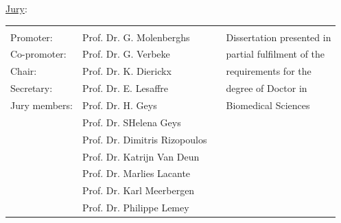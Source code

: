 \begin{titlepage}
{\vspace{1.9cm}
\begin{minipage}{0.4\textwidth}                                                    %
\begin{flushleft}   \small                                                        %
\hspace{0.3cm}\underline{Jury}:
\begin{tabular}{llp{0.5cm}l}
                 \vspace{0.2cm}  & \vspace{0.2cm}  &&\\
                 \hspace{0.1cm} Promoter: & Prof. Dr. G. Molenberghs&& Dissertation presented in  \\
                 \hspace{0.1cm} Co-promoter: & Prof. Dr. G. Verbeke&&  partial fulfilment of the \\
                 \hspace{0.1cm} Chair: & Prof. Dr. K. Dierickx&&  requirements for the \\
                 \hspace{0.1cm} Secretary: & Prof. Dr. E. Lesaffre&& degree of Doctor in \\
                 \hspace{0.1cm} Jury members: & Prof. Dr. H. Geys&&  Biomedical Sciences\\
                                                & Prof. Dr. SHelena Geys &&   \\
                                                & Prof. Dr. Dimitris Rizopoulos && \\
                                                &  Prof. Dr. Katrijn Van Deun  && \\
                                                &  Prof. Dr. Marlies Lacante  &&\\
                                                &  Prof. Dr. Karl Meerbergen  &&\\
                                                &  Prof. Dr. Philippe Lemey  &&
               \end{tabular}%
\end{flushleft}                                                                     %
\end{minipage}                                                   %

\vspace{1.3cm}
\begin{center}
\end{center}



}

\end{titlepage}
\clearpage
